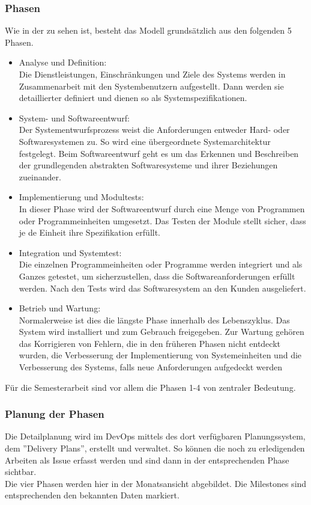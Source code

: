 \subsubsection{Phasen}
Wie in der  zu sehen ist, besteht das Modell grundsätzlich aus den folgenden 5 Phasen.
  \begin{itemize}
      \item Analyse und Definition:\\
      Die Dienstleistungen, Einschränkungen und Ziele des Systems werden in Zusammenarbeit mit den Systembenutzern aufgestellt. Dann werden sie detaillierter  definiert und dienen so als Systemspezifikationen. 
      \item System- und Softwareentwurf:\\  Der Systementwurfsprozess weist die Anforderungen entweder Hard- oder Softwaresystemen zu. So wird eine übergeordnete Systemarchitektur festgelegt. Beim Softwareentwurf geht es um das Erkennen und Beschreiben der grundlegenden abstrakten Softwaresysteme und ihrer Beziehungen zueinander. 
      \item Implementierung und Modultests:\\  In dieser Phase wird der Softwareentwurf durch eine Menge von Programmen oder Programmeinheiten umgesetzt. Das Testen der Module stellt sicher, dass je de Einheit ihre Spezifikation erfüllt.
      \item Integration und Systemtest:\\  Die einzelnen Programmeinheiten oder Programme werden integriert und als Ganzes getestet, um sicherzustellen, dass die Softwareanforderungen erfüllt werden. Nach den Tests wird das Softwaresystem an den Kunden ausgeliefert.
      \item Betrieb und Wartung:\\ Normalerweise ist dies die längste Phase innerhalb des Lebenszyklus. Das System wird installiert und zum Gebrauch freigegeben. Zur Wartung gehören das Korrigieren von Fehlern,  die in den früheren Phasen nicht entdeckt wurden, die Verbesserung der Implementierung von Systemeinheiten und die Verbesserung des Systems, falls neue Anforderungen aufgedeckt werden
  \end{itemize}

Für die Semesterarbeit sind vor allem die Phasen 1-4 von zentraler Bedeutung.
\newpage
\subsubsection{Planung der Phasen}
Die Detailplanung wird im DevOps mittels des dort verfügbaren Planungssystem, dem ''Delivery Plans'', erstellt und verwaltet. So können die noch zu erledigenden Arbeiten als Issue erfasst werden und sind dann in der entsprechenden Phase sichtbar.\\
Die vier Phasen werden hier in der Monatsansicht abgebildet. Die Milestones sind entsprechenden den bekannten Daten markiert.

